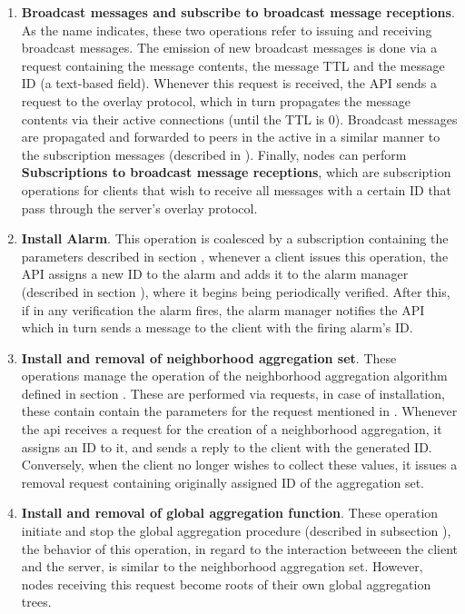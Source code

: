 \begin{enumerate}
    \item \textbf{Broadcast messages and subscribe to broadcast message receptions}. As the name indicates, these two operations refer to issuing and receiving broadcast messages. The emission of new broadcast messages is done via a request containing the message contents, the message TTL and the message ID (a text-based field). Whenever this request is received, the API sends a request to the overlay protocol, which in turn propagates the message contents via their active connections (until the TTL is 0). Broadcast messages are propagated and forwarded to peers in the active in a similar manner to the subscription messages (described in ). Finally, nodes can perform \textbf{Subscriptions to broadcast message receptions}, which are subscription operations for clients that wish to receive all messages with a certain ID that pass through the server's overlay protocol. 
    
    \item \textbf{Install Alarm}. This operation is coalesced by a subscription containing the parameters described in section , whenever a client issues this operation, the API assigns a new ID to the alarm and adds it to the alarm manager (described in section ), where it begins being periodically verified. After this, if in any verification the alarm fires, the alarm manager notifies the API which in turn sends a message to the client with the firing alarm's ID.

    \item \textbf{Install and removal of neighborhood aggregation set}. These operations manage the operation of the neighborhood aggregation algorithm defined in section . These are performed via requests, in case of installation, these contain contain the parameters for the request mentioned in . Whenever the api receives a request for the creation of a neighborhood aggregation, it assigns an ID to it, and sends a reply to the client with the generated ID. Conversely, when the client no longer wishes to collect these values, it issues a removal request containing originally assigned ID of the aggregation set.

    \item \textbf{Install and removal of global aggregation function}. These operation initiate and stop the global aggregation procedure (described in subsection ), the behavior of this operation, in regard to the interaction betweeen the client and the server, is similar to the neighborhood aggregation set. However, nodes receiving this request become roots of their own global aggregation trees.


\end{enumerate}
